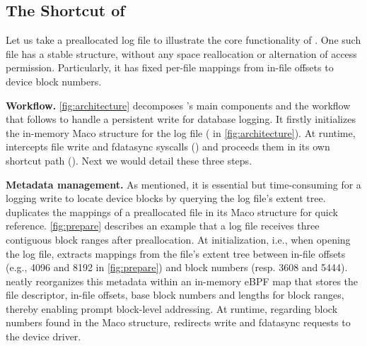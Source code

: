 \subsection{The Shortcut of \odes}\label{sec:design:components}

Let us take a preallocated log file to 
illustrate the core functionality of \odes.
 One such file  has a stable structure, 
without any space reallocation or alternation of access permission.
Particularly, it has
fixed per-file mappings from
 in-file offsets to device block numbers. 

\textbf{Workflow.} \autoref{fig:architecture} decomposes \odes's main components
and the workflow that \odes follows to handle a persistent write for database logging.
It firstly initializes the in-memory Maco structure for the log file ( in \autoref{fig:architecture}).
At runtime,  \odes intercepts file write and fdatasync syscalls
() and proceeds them in its own shortcut path ().
Next we would detail these three steps.

\textbf{Metadata management.}
As mentioned,
it is essential but time-consuming for a logging write
to locate device blocks   by querying the log file's extent tree.
 \odes duplicates  the mappings of a preallocated file in its Maco structure for quick reference. 
\autoref{fig:prepare} describes an example that a log file receives
three contiguous block ranges after preallocation.
 At initialization, i.e., when opening the log   file, \odes extracts  mappings from the file's extent tree
between  in-file offsets (e.g., 4096 and 8192 in   \autoref{fig:prepare}) and    block numbers (resp. 3608 and 5444). 
\odes neatly reorganizes this metadata
 within an in-memory eBPF map that stores the file descriptor, in-file offsets, base block numbers and lengths for block ranges, thereby enabling prompt block-level addressing.
At runtime,
regarding block numbers found in the Maco structure,
\odes
redirects   write and fdatasync requests to the device driver.


